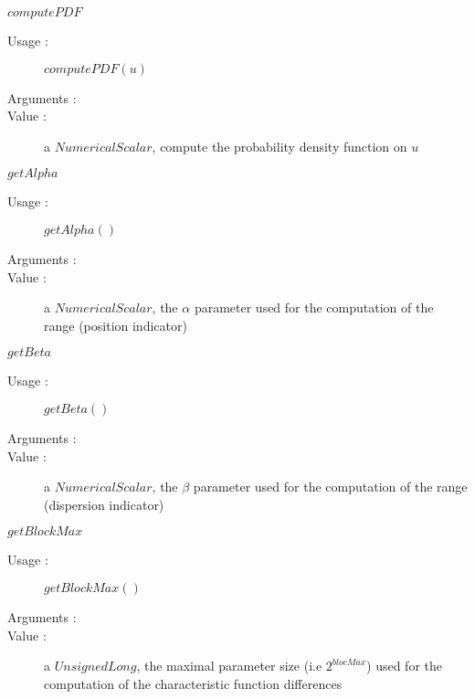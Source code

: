\begin{description}
\begin{description}
  \item $computePDF$
    \begin{description}
    \item[Usage :]  $computePDF(u)$
    \item[Arguments :]  \strut
    \item[Value :] a $NumericalScalar$, compute the probability density function on $u$
    \end{description}

  \item $getAlpha$
    \begin{description}
    \item[Usage :]  $getAlpha()$
    \item[Arguments :]  \strut
    \item[Value :] a $NumericalScalar$, the $\alpha$ parameter used for the computation of the range (position indicator)
    \end{description}

  \item $getBeta$
    \begin{description}
    \item[Usage :]  $getBeta()$
    \item[Arguments :]  \strut
    \item[Value :] a $NumericalScalar$, the $\beta$ parameter used for the computation of the range (dispersion indicator)
    \end{description}

  \item $getBlockMax$
    \begin{description}
    \item[Usage :]  $getBlockMax()$
    \item[Arguments :]  \strut
    \item[Value :] a $UnsignedLong$, the maximal parameter size (i.e $2^{blocMax}$) used for the computation of the characteristic function differences
    \end{description}


\end{description}
\end{description}
